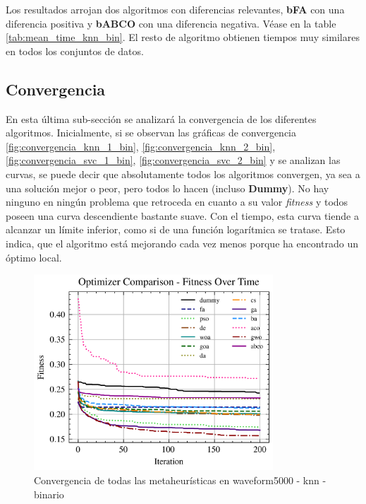 Los resultados arrojan dos algoritmos con diferencias relevantes, \textbf{bFA} con una diferencia positiva y \textbf{bABCO} con una diferencia negativa. Véase en la table \ref{tab:mean_time_knn_bin}. El resto de algoritmo obtienen tiempos muy similares en todos los conjuntos de datos.

\subsection{Convergencia}
En esta última sub-sección se analizará la convergencia de los diferentes algoritmos. Inicialmente, si se observan las gráficas de convergencia \ref{fig:convergencia_knn_1_bin}, \ref{fig:convergencia_knn_2_bin}, \ref{fig:convergencia_svc_1_bin}, \ref{fig:convergencia_svc_2_bin} y se analizan las curvas, se puede decir que absolutamente todos los algoritmos convergen, ya sea a una solución mejor o peor, pero todos lo hacen (incluso \textbf{Dummy}). No hay ninguno en ningún problema que retroceda en cuanto a su valor \textit{fitness} y todos poseen una curva descendiente bastante suave. Con el tiempo, esta curva tiende a alcanzar un límite inferior, como si de una función logarítmica se tratase. Esto indica, que el algoritmo está mejorando cada vez menos porque ha encontrado un óptimo local.

\begin{figure}[htp]
    \includegraphics[width=0.8\textwidth]{imagenes/fitness_charts/img/binary/waveform5000/optimizers_fitness_knn.png}
    \caption{Convergencia de todas las metaheurísticas en waveform5000 - knn - binario}
\end{figure}

